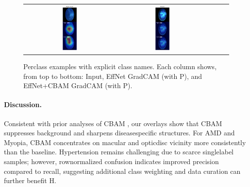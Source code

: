 \begin{figure}[t]
\begin{tabular}{ccccc}
    \includegraphics[width=0.18\textwidth]{../new_work/figures/gradcam_benchmark_Hypertension.png} &
    \includegraphics[width=0.18\textwidth]{../new_work/figures/gradcam_benchmark_Myopia.png} \\
  \end{tabular}
  \caption{Per\textendash class examples with explicit class names. Each column shows, from top to bottom: Input, EffNet Grad\textendash CAM (with P), and EffNet+CBAM Grad\textendash CAM (with P).}
  \label{fig:gradcam_perclass}
\end{figure}

\paragraph{Discussion.} Consistent with prior analyses of CBAM \cite{cbamDO,cbamMedium,woo2018cbam}, our overlays show that CBAM suppresses background and sharpens disease\textendash specific structures. For AMD and Myopia, CBAM concentrates on macular and optic\textendash disc vicinity more consistently than the baseline. Hypertension remains challenging due to scarce single\textendash label samples; however, row\textendash normalized confusion indicates improved precision compared to recall, suggesting additional class weighting and data curation can further benefit H.

